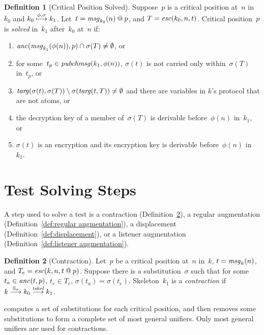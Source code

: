 \documentclass[12pt]{report}
\theoremstyle{definition}
\newtheorem{defn}{Definition}[chapter]
\newcommand{\pubchmsg}{\fn{pubchmsg}}
\newcommand{\msg}{\fn{msg}}
\begin{document}
\begin{defn}[Critical Position Solved]\label{def:critical position solved}
Suppose~$p$ is a critical position at~$n$ in~$k_0$ and
$k_0\stackrel{\phi,\sigma}{\longmapsto}k_1$.  Let~$t=\msg_{k_0}(n)\termat p$,
 and $T=\operatorname{\mathit{esc}}(k_0,n,t)$.  Critical position~$p$ is
\emph{solved} in~$k_1$ after~$k_0$
at~$n$ if:
\begin{enumerate}
\item\label{item:anc}
  $\fn{anc}(\msg_{k_1}(\phi(n)),p)\cap\sigma(T)\neq\emptyset$, or
\item\label{item:aug} for some~$t_p\in\pubchmsg(k_1,\phi(n))$,
  $\sigma(t)$ is not carried only within~$\sigma(T)$ in~$t_p$, or
\item\label{item:targs}
  $\operatorname{\mathit{targ}}(\sigma(t),\sigma(T))\setminus\sigma(\operatorname{\mathit{targ}}(t,T))\neq\emptyset$
  and there are variables in $k$'s protocol that are not atoms, or
\item\label{item:dec} the decryption key of a member of~$\sigma(T)$ is
  derivable before~$\phi(n)$ in~$k_1$, or
\item\label{item:enc} $\sigma(t)$ is an encryption and its encryption
  key is derivable before~$\phi(n)$ in~$k_1$.
\end{enumerate}
\end{defn}

\section{Test Solving Steps}

A step used to solve a test is a contraction
(Definition~\ref{def:contraction}), a regular augmentation
(Definition~\ref{def:regular augmentation}), a displacement
(Definition~\ref{def:displacement}), or a listener augmentation
(Definition~\ref{def:listener augmentation}).

\begin{defn}[Contraction]\label{def:contraction}
Let~$p$ be a critical position
at~$n$ in~$k$, $t=\msg_k(n)$, and $T_e= \operatorname{\mathit{esc}}(k,n,t\mathbin{@} p)$.
Suppose there is a substitution~$\sigma$ such that for
some~$t_a\in\operatorname{\mathit{anc}}(t,p)$, $t_e\in T_e$, $\sigma(t_a)=\sigma(t_e)$.
Skeleton~$k_1$ is a \emph{contraction} if
$k\stackrel{\mathbb S_\sigma}{\longrightarrow}k_0\stackrel{\operatorname{\mathit{tskel}}}{\longrightarrow}k_1$.
\end{defn}

{\cpsa} computes a set of substitutions for each critical position, and
then removes some substitutions to form a complete set of most
general unifiers.  Only most general unifiers are used for
contractions.
\end{document}
